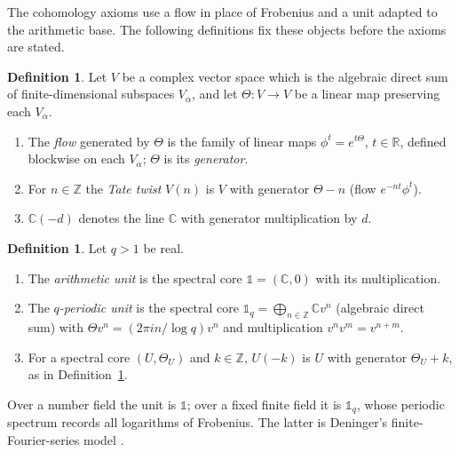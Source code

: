 \documentclass[11pt]{amsart}
\theoremstyle{plain}
\theoremstyle{definition}
\newtheorem{definition}[theorem]{Definition}
\theoremstyle{remark}
\numberwithin{equation}{section}
\newcommand{\C}{\mathbb{C}}
\newcommand{\R}{\mathbb{R}}
\newcommand{\Z}{\mathbb{Z}}
\begin{document}
The cohomology axioms use a flow in place of Frobenius and a unit
adapted to the arithmetic base. The following definitions fix these
objects before the axioms are stated.

\begin{definition}\label{def:flow}
Let $V$ be a complex vector space which is the algebraic direct sum of
finite-dimensional subspaces $V_\alpha$, and let $\Theta:V\to V$ be a
linear map preserving each $V_\alpha$.
\begin{enumerate}[label=(\alph*)]
\item The \emph{flow} generated by $\Theta$ is the family of linear maps
  $\phi^t=e^{t\Theta}$, $t\in\R$, defined blockwise on each $V_\alpha$;
  $\Theta$ is its \emph{generator}.
\item For $n\in\Z$ the \emph{Tate twist} $V(n)$ is $V$ with generator
  $\Theta-n$ (flow $e^{-nt}\phi^t$).
\item $\C(-d)$ denotes the line $\C$ with generator multiplication by
  $d$.
\end{enumerate}
\end{definition}

\begin{definition}\label{def:unit}
Let $q>1$ be real.
\begin{enumerate}[label=(\alph*)]
\item The \emph{arithmetic unit} is the spectral core
  $\mathbb 1=(\C,0)$ with its multiplication.
\item The \emph{$q$-periodic unit} is the spectral core
  $\mathbb 1_q=\bigoplus_{n\in\Z}\C v^n$ (algebraic direct sum) with
  $\Theta v^n=(2\pi in/\log q)v^n$ and multiplication
  $v^nv^m=v^{n+m}$.
\item For a spectral core $(U,\Theta_U)$ and $k\in\Z$, $U(-k)$ is $U$
  with generator $\Theta_U+k$, as in Definition~\ref{def:flow}.
\end{enumerate}
\end{definition}

Over a number field the unit is $\mathbb 1$; over a fixed finite field
it is $\mathbb 1_q$, whose periodic spectrum records all logarithms
of Frobenius. The latter is Deninger's finite-Fourier-series model
\cite[pp.~167--168 and Proposition~3.1]{Deninger1998Analogies}.
\end{document}
